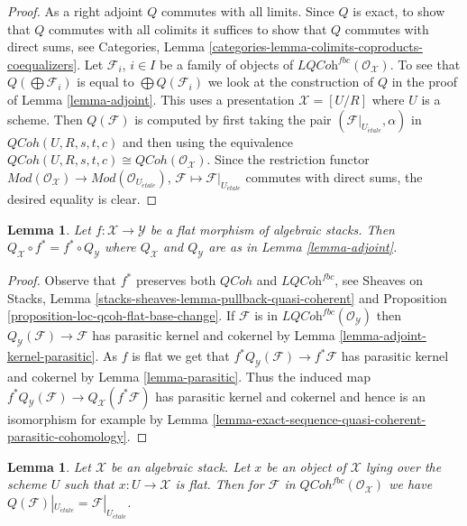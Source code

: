 \documentclass{stacks-project}
\theoremstyle{plain}
\newtheorem{lemma}[subsection]{Lemma}
\theoremstyle{definition}
\theoremstyle{remark}
\numberwithin{equation}{subsection}
\def\etale{{\acute{e}tale}}
\def\QCoh{\mathit{QCoh}}
\begin{document}
\begin{proof}
\medskip\noindent
As a right adjoint $Q$ commutes with all limits. Since $Q$ is exact, to
show that $Q$ commutes with all colimits it suffices to show that $Q$
commutes with direct sums, see
Categories, Lemma \ref{categories-lemma-colimits-coproducts-coequalizers}.
Let $\mathcal{F}_i$, $i \in I$ be a family of objects of
$\textit{LQCoh}^{fbc}(\mathcal{O}_\mathcal{X})$. To see that
$Q(\bigoplus \mathcal{F}_i)$ is equal to $\bigoplus Q(\mathcal{F}_i)$
we look at the construction of $Q$ in the proof of
Lemma \ref{lemma-adjoint}. This uses a presentation $\mathcal{X} = [U/R]$
where $U$ is a scheme. Then $Q(\mathcal{F})$
is computed by first taking the pair
$(\mathcal{F}|_{U_\etale}, \alpha)$ in $\QCoh(U, R, s, t, c)$
and then using the equivalence
$\QCoh(U, R, s, t, c) \cong \QCoh(\mathcal{O}_\mathcal{X})$.
Since the restriction functor $\textit{Mod}(\mathcal{O}_\mathcal{X}) \to
\textit{Mod}(\mathcal{O}_{U_\etale})$,
$\mathcal{F} \mapsto \mathcal{F}|_{U_\etale}$ commutes with
direct sums, the desired equality is clear.
\end{proof}

\begin{lemma}
\label{lemma-flat-morphism-and-Q}
Let $f : \mathcal{X} \to \mathcal{Y}$ be a flat morphism of algebraic stacks.
Then $Q_\mathcal{X} \circ f^* = f^* \circ Q_\mathcal{Y}$ where
$Q_\mathcal{X}$ and $Q_\mathcal{Y}$ are as in Lemma \ref{lemma-adjoint}.
\end{lemma}

\begin{proof}
Observe that $f^*$ preserves both $\QCoh$ and $\textit{LQCoh}^{fbc}$,
see Sheaves on Stacks, Lemma
\ref{stacks-sheaves-lemma-pullback-quasi-coherent} and
Proposition \ref{proposition-loc-qcoh-flat-base-change}.
If $\mathcal{F}$ is in $\textit{LQCoh}^{fbc}(\mathcal{O}_\mathcal{Y})$
then $Q_\mathcal{Y}(\mathcal{F}) \to \mathcal{F}$
has parasitic kernel and cokernel
by Lemma \ref{lemma-adjoint-kernel-parasitic}.
As $f$ is flat we get that $f^*Q_\mathcal{Y}(\mathcal{F}) \to f^*\mathcal{F}$
has parasitic kernel and cokernel by
Lemma \ref{lemma-parasitic}.
Thus the induced map
$f^*Q_\mathcal{Y}(\mathcal{F}) \to Q_\mathcal{X}(f^*\mathcal{F})$
has parasitic kernel and cokernel and hence is an isomorphism
for example by
Lemma \ref{lemma-exact-sequence-quasi-coherent-parasitic-cohomology}.
\end{proof}

\begin{lemma}
\label{lemma-flat-object-and-Q}
Let $\mathcal{X}$ be an algebraic stack. Let $x$ be an object of $\mathcal{X}$
lying over the scheme $U$ such that $x : U \to \mathcal{X}$ is flat.
Then for $\mathcal{F}$ in $\QCoh^{fbc}(\mathcal{O}_\mathcal{X})$
we have $Q(\mathcal{F})|_{U_\etale} = \mathcal{F}|_{U_\etale}$.
\end{lemma}
\end{document}
